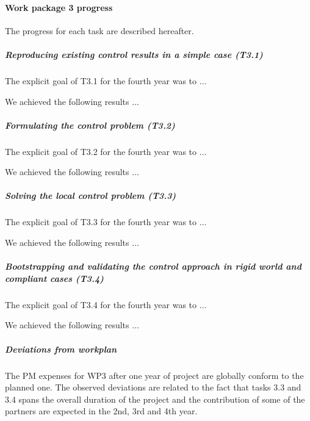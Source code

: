 

 
\paragraph{Work package 3 progress}

The progress for each task are described hereafter.

\subparagraph{Reproducing existing control results in a simple case (T3.1)}

The explicit goal of T3.1 for the fourth year was to $\dots$

We achieved the following results $\dots$

\subparagraph{Formulating the control problem (T3.2)}

The explicit goal of T3.2 for the fourth year was to $\dots$

We achieved the following results $\dots$

\subparagraph{Solving the local control problem (T3.3)}

The explicit goal of T3.3 for the fourth year was to $\dots$

We achieved the following results $\dots$
    

\subparagraph{Bootstrapping and validating the control approach in rigid world and compliant cases (T3.4)}

The explicit goal of T3.4 for the fourth year was to $\dots$

We achieved the following results $\dots$
    
\subparagraph{Deviations from workplan}  

The PM expenses for WP3 after one year of project are globally conform to the planned one. The observed deviations are related to the fact that tasks 3.3 and 3.4 spans the overall duration of the project and the contribution of some of the partners are expected in the 2nd, 3rd and 4th year.

